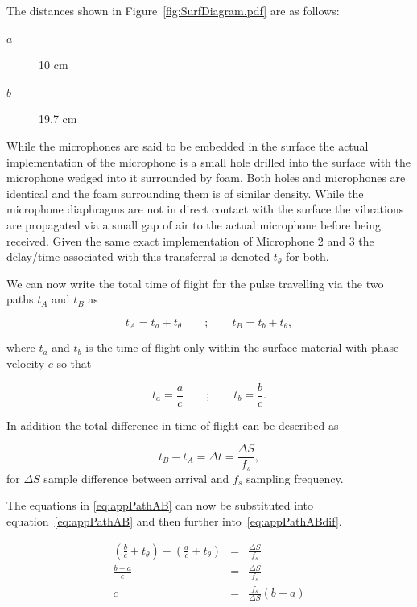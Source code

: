 The distances shown in Figure~\ref{fig:SurfDiagram.pdf} are as follows:
\begin{description}
  \item[$a$] 10 cm
  \item[$b$] 19.7 cm
\end{description}

While the microphones are said to be embedded in the surface the actual implementation of the microphone is a small hole drilled into the surface with the microphone wedged into it surrounded by foam. Both holes and microphones are identical and the foam surrounding them is of similar density. While the microphone diaphragms are not in direct contact with the surface the vibrations are propagated via a small gap of air to the actual microphone before being received. Given the same exact implementation of Microphone 2 and 3 the delay/time associated with this transferral is denoted $t_\theta$ for both.

We can now write the total time of flight for the pulse travelling via the two paths $t_A$ and $t_B$ as

\begin{equation}\label{eq:appPathAB}
t_A = t_a + t_\theta \qquad ; \qquad t_B = t_b + t_\theta,
\end{equation}

where $t_a$ and $t_b$ is the time of flight only within the surface material with phase velocity $c$ so that

\begin{equation}\label{eq:appPathABSpeed}
t_a = \frac{a}{c} \qquad ; \qquad t_b = \frac{b}{c}.
\end{equation}

In addition the total difference in time of flight can be described as

\begin{equation}\label{eq:appPathABdif}
t_B - t_A = \Delta t = \frac{\Delta S}{f_s},
\end{equation}
for $\Delta S$ sample difference between arrival and $f_s$ sampling frequency.

The equations in \ref{eq:appPathAB} can now be substituted into equation~\ref{eq:appPathAB} and then further into~\ref{eq:appPathABdif}.

\begin{eqnarray}
\nonumber   \left(\frac{b}{c} + t_\theta\right) - \left(\frac{a}{c} + t_\theta\right) &=& \frac{\Delta S}{f_s} \\
\nonumber   \frac{b-a}{c} &=& \frac{\Delta S}{f_s} \\
            c &=& \frac{f_s}{\Delta S} \left( b-a \right)
\end{eqnarray}

